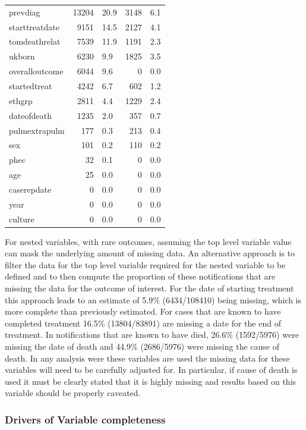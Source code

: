 \documentclass[11pt,twoside]{bristolthesis}
\begin{document}
\begin{table}[H]
\begin{tabular}{lrlrl}
  \addlinespace
  prevdiag & 13204 & 20.9 & 3148 & 6.1\\
  starttreatdate & 9151 & 14.5 & 2127 & 4.1\\
  tomdeathrelat & 7539 & 11.9 & 1191 & 2.3\\
  ukborn & 6230 & 9.9 & 1825 & 3.5\\
  overalloutcome & 6044 & 9.6 & 0 & 0.0\\
  \addlinespace
  startedtreat & 4242 & 6.7 & 602 & 1.2\\
  ethgrp & 2811 & 4.4 & 1229 & 2.4\\
  dateofdeath & 1235 & 2.0 & 357 & 0.7\\
  pulmextrapulm & 177 & 0.3 & 213 & 0.4\\
  sex & 101 & 0.2 & 110 & 0.2\\
  \addlinespace
  phec & 32 & 0.1 & 0 & 0.0\\
  age & 25 & 0.0 & 0 & 0.0\\
  caserepdate & 0 & 0.0 & 0 & 0.0\\
  year & 0 & 0.0 & 0 & 0.0\\
  culture & 0 & 0.0 & 0 & 0.0\\
  \bottomrule
  \end{tabular}
  \end{table}
  For nested variables, with rare outcomes, assuming the top level variable value can mask the underlying amount of missing data. An alternative approach is to filter the data for the top level variable required for the nested variable to be defined and to then compute the proportion of these notifications that are missing the data for the outcome of interest. For the date of starting treatment this approach leads to an estimate of 5.9\% (6434/108410) being missing, which is more complete than previously estimated. For cases that are known to have completed treatment 16.5\% (13804/83891) are missing a date for the end of treatment. In notifications that are known to have died, 26.6\% (1592/5976) were missing the date of death and 44.9\% (2686/5976) were missing the cause of death. In any analysis were these variables are used the missing data for these variables will need to be carefully adjusted for. In particular, if cause of death is used it must be clearly stated that it is highly missing and results based on this variable should be properly caveated.
  
  \hypertarget{drivers-of-variable-completeness}{%
  \subsubsection{Drivers of Variable completeness}\label{drivers-of-variable-completeness}}
  
\end{document}
